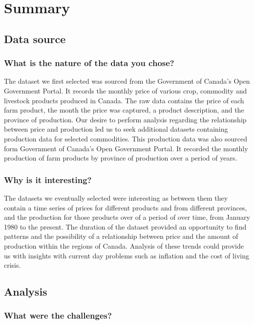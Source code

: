 \section{Summary}

\subsection{Data source}

\subsubsection{What is the nature of the data you chose?}

The dataset we first selected was sourced from the Government of Canada’s Open Government Portal. It records the monthly price of various crop, commodity and livestock products produced in Canada. The raw data contains the price of each farm product, the month the price was captured, a product description, and the province of production. Our desire to perform analysis regarding the relationship between price and production led us to seek additional datasets containing production data for selected commodities. This production data was also sourced form Government of Canada’s Open Government Portal. It recorded the monthly production of farm products by province of production over a period of years.  
\subsubsection{Why is it interesting?}

The datasets we eventually selected were interesting as between them they contain a time series of prices for different products and from different provinces, and the production for those products over of a period of over time, from January 1980 to the present. The duration of the  dataset provided an opportunity to find patterns and the possibility of a relationship between price and the amount of production within the regions of Canada.  Analysis of these trends  could provide us with insights with current day problems such as inflation and the cost of living crisis. 
\subsection{Analysis}

\subsubsection{What were the challenges?}

